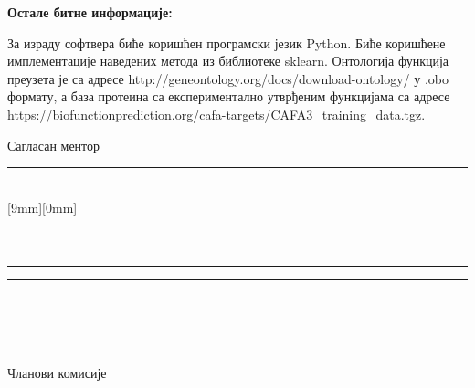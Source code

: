 \documentclass[a4paper]{article}
\begin{document}
\begin{flushleft}
{\begin{minipage}[t][12cm]{17.5cm}
\textbf{Остале битне информације:}

За израду софтвера биће коришћен програмски језик Python. Биће коришћене имплементације наведених метода из библиотеке sklearn. Онтологија функција преузета је са адресе http://geneontology.org/docs/download-ontology/ у .obo формату, а база протеина са експериментално утврђеним функцијама са адресе  https://biofunctionprediction.org/cafa-targets/CAFA3\_training\_data.tgz.
\\


\end{minipage}
}
\end{flushleft}
\vspace{1cm}
Сагласан ментор  \\
\rule[4mm]{10cm}{.05mm} \hfill {} \\
\raisebox{1cm}%
[9mm][0mm]{} \\
\makebox[10cm]{ }\\
\vspace{-1cm}\\
\rule[2cm]{6.5cm}{.05mm} \hfill \rule[2cm]{6.5cm}{.05mm}\\
\vspace{-2.4cm}\\
\hfill {}\\
\vspace{-2cm}\\
\makebox[5.5cm]{}  Чланови комисије\\
\end{document}
